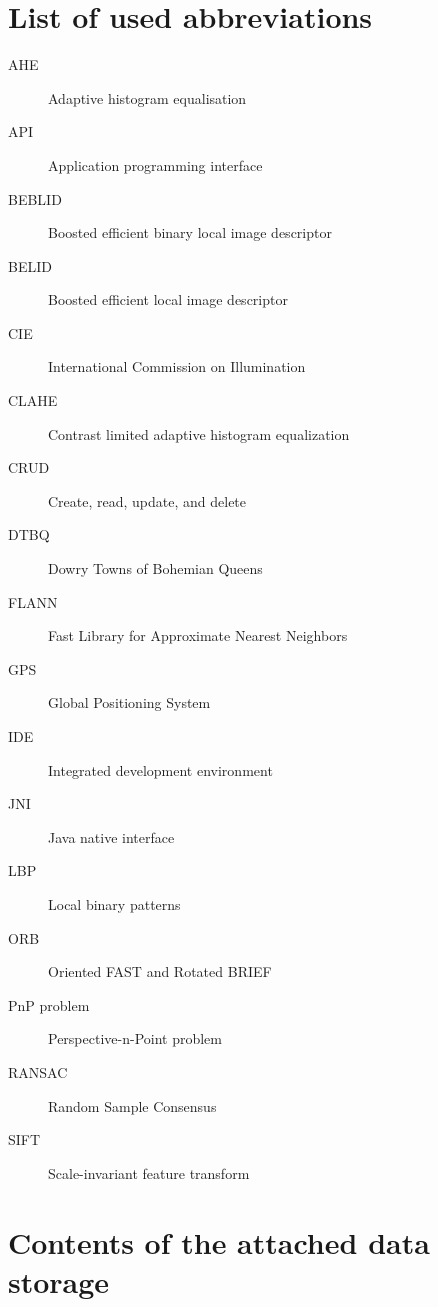 \documentclass[thesis=B,english]{FITthesis}[2019/12/23]
\begin{document}
\chapter{List of used abbreviations}
\begin{description}
    \item[AHE] Adaptive histogram equalisation
    \item[API] Application programming interface
    \item[BEBLID] Boosted efficient binary local image descriptor
    \item[BELID] Boosted efficient local image descriptor
    \item[CIE] International Commission on Illumination
    \item[CLAHE] Contrast limited adaptive histogram equalization
    \item[CRUD] Create, read, update, and delete
    \item[DTBQ] Dowry Towns of Bohemian Queens
    \item[FLANN] Fast Library for Approximate Nearest Neighbors
    \item[GPS] Global Positioning System
    \item[IDE] Integrated development environment
    \item[JNI] Java native interface
    \item[LBP] Local binary patterns
    \item[ORB] Oriented FAST and Rotated BRIEF
    \item[PnP problem] Perspective-n-Point problem
    \item[RANSAC] Random Sample Consensus
    \item[SIFT] Scale-invariant feature transform

\end{description}

\chapter{Contents of the attached data storage}


\begin{figure}
\end{figure}
\end{document}
